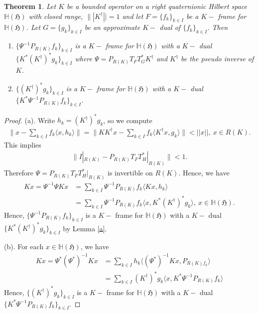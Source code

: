 \documentclass[a4paper,12pt,reqno]{amsart}
\theoremstyle{plain}
\newtheorem{theorem}{\bf Theorem}[section]
\theoremstyle{remark}
\begin{document}
	
	\begin{theorem}
		Let $K$ be a bounded operator on a right quaternionic Hilbert space $\mathbb{H}(\mathfrak{H})$ with closed range, $\||K^{\dagger}||=1$ and let $F=\{f_k\}_{k\in I}$ be a $K-$ frame for $\mathbb{H}(\mathfrak{H})$. Let $G=\{g_k\}_{k\in I}$ be an approximate $K-$ dual of $\{f_k\}_{k\in I}$. Then 
		\begin{enumerate}
			\item [(a)] $\{\Psi^{-1}P_{R(K)}f_k\}_{k\in I}$ is a $K-$ frame for $\mathbb{H}(\mathfrak{H})$ with a $K-$ dual $\{K^*(K^{\dagger})^*g_k\}_{k\in I}$ where $\Psi=P_{R(K)}T_F T_G^*K^{\dagger}$ and $K^{\dagger}$ be the pseudo inverse of $K$.
			
			\item [(b)] $\{(K^{\dagger})^*g_k\}_{k\in I}$ is a $K-$ frame for $\mathbb{H}(\mathfrak{H})$ with a $K-$ dual $\{K^*\Psi ^{-1}P_{R(K)}f_k\}_{k\in I}$.
		\end{enumerate}
	\end{theorem}
	\begin{proof}
		(a).  Write $h_k=(K^{\dagger})^*g_k$, so we compute
		\begin{align*}
			\Bigg\|x-\sum_{k\in I}f_k \langle x, h_k \rangle \Bigg\| = \Bigg\|KK^{\dagger}x -\sum_{k\in I}f_k\langle K^{\dagger}x, g_k\rangle \Bigg\|<||x||, \ x\in R(K).
		\end{align*}
		This implies 
		\begin{align*}
			\Bigg\|I| _{R(K)}-P_{R(K)}T_{F}{T^*_H}|_{R(K)}\Bigg\|<1.
		\end{align*}
		Therefore $\Psi=P_{R(K)}T_{F}{T^*_H}|_{R(K)}$ is invertible on $R(K)$. Hence, we have 
		\begin{align*}
			Kx=\Psi^{-1}\Psi Kx&= \sum_{k\in I}\Psi^{-1}P_{R(K)}f_k\langle Kx, h_k\rangle\\
			&= \sum_{k\in I}\Psi^{-1}P_{R(K)}f_k\langle x, K^* (K^{\dagger})^*g_k\rangle, \ x\in\mathbb{H}(\mathfrak{H}).
		\end{align*}
		Hence, $\{\Psi^{-1}P_{R(K)}f_k\}_{k\in I}$ is a $K-$ frame for $\mathbb{H}(\mathfrak{H})$ with a $K-$ dual $\{K^*(K^{\dagger})^*g_k\}_{k\in I}$ by Lemma \ref{a}.
		
		(b). For each $x\in \mathbb{H}(\mathfrak{H})$, we have 
		\begin{align*}
			Kx=\Psi^*(\Psi^*)^{-1}Kx&= \sum_{k\in I} h_k \langle (\Psi^*)^{-1} Kx, P_{R(K)f_k}\rangle\\
			& = \sum_{k\in I}(K^{\dagger})^*g_k\langle x, K^*\Psi^{-1} P_{R(K)}f_k\rangle
		\end{align*}
		Hence,  $\{(K^{\dagger})^*g_k\}_{k\in I}$ is a $K-$ frame for $\mathbb{H}(\mathfrak{H})$ with a $K-$ dual $\{K^*\Psi ^{-1}P_{R(K)}f_k\}_{k\in I}$.
	\end{proof}
	
\end{document}

